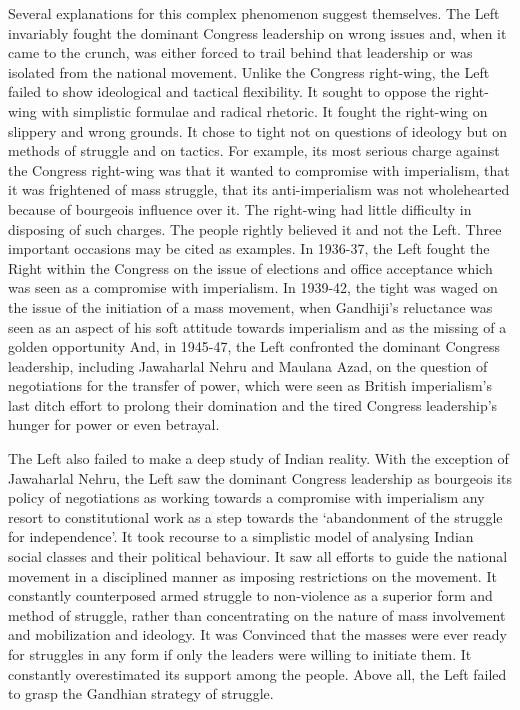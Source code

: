 Several explanations for this complex phenomenon suggest themselves. The Left invariably fought the dominant Congress leadership on wrong issues and, when it came to the crunch, was either forced to trail behind that leadership or was isolated from the national movement. Unlike the Congress right-wing, the Left failed to show ideological and tactical flexibility. It sought to oppose the right-wing with simplistic formulae and radical rhetoric. It fought the right-wing on slippery and wrong grounds. It chose to tight not on questions of ideology but on methods of struggle and on tactics. For example, its most serious charge against the Congress right-wing was that it wanted to compromise with imperialism, that it was frightened of mass struggle, that its anti-imperialism was not wholehearted because of bourgeois influence over it. The right-wing had little difficulty in disposing of such charges. The people rightly believed it and not the Left. Three important occasions may be cited as examples. In 1936-37, the Left fought the Right within the Congress on the issue of elections and office acceptance which was seen as a compromise with imperialism. In 1939-42, the tight was waged on the issue of the initiation of a mass movement, when Gandhiji's reluctance was seen as an aspect of his soft attitude towards imperialism and as the missing of a golden opportunity And, in 1945-47, the Left confronted the dominant Congress leadership, including Jawaharlal Nehru and Maulana Azad, on the question of negotiations for the transfer of power, which were seen as British imperialism's last ditch effort to prolong their domination and the tired Congress leadership's hunger for power or even betrayal. 

The Left also failed to make a deep study of Indian reality. With the exception of Jawaharlal Nehru, the Left saw the dominant Congress leadership as bourgeois its policy of negotiations as working towards a compromise with imperialism any resort to constitutional work as a step towards the `abandonment of the struggle for independence'. It took recourse to a simplistic model of analysing Indian social classes and their political behaviour. It saw all efforts to guide the national movement in a disciplined manner as imposing restrictions on the movement. It constantly counterposed armed struggle to non-violence as a superior form and method of struggle, rather than concentrating on the nature of mass involvement and mobilization and ideology. It was Convinced that the masses were ever ready for struggles in any form if only the leaders were willing to initiate them. It constantly overestimated its support among the people. Above all, the Left failed to grasp the Gandhian strategy of struggle. 

